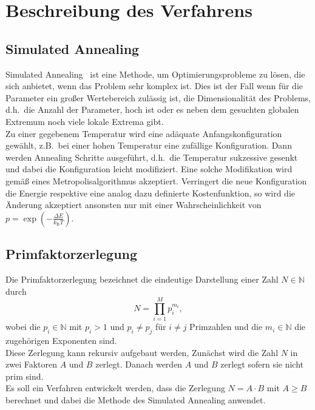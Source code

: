 \chapter{Beschreibung des Verfahrens}

\section{Simulated Annealing}
Simulated Annealing~\parencite{nr} ist eine Methode, um Optimierungsprobleme zu lösen, die sich anbietet, wenn das Problem sehr komplex ist. Dies ist der Fall wenn für die Parameter ein großer Wertebereich zulässig ist, die Dimensionalität des Problems, d.h.\ die Anzahl der Parameter, hoch ist oder es neben dem gesuchten globalen Extremum noch viele lokale Extrema gibt. \\
Zu einer gegebenem Temperatur wird eine adäquate Anfangskonfiguration gewählt, z.B.\ bei einer hohen Temperatur eine zufällige Konfiguration. Dann werden Annealing Schritte ausgeführt, d.h.\ die Temperatur sukzessive gesenkt und dabei die Konfiguration leicht modifiziert. Eine solche Modifikation wird gemäß eines Metropolisalgorithmus akzeptiert. Verringert die neue Konfiguration die Energie respektive eine analog dazu definierte Kostenfunktion, so wird die Änderung akzeptiert ansonsten nur mit einer Wahrscheinlichkeit von $p=\exp\left(-\frac{\Delta E}{k_\mathrm{B}T}\right)$.

\section{Primfaktorzerlegung}
Die Primfaktorzerlegung bezeichnet die eindeutige Darstellung einer Zahl $N\in\mathbb{N}$ durch
\begin{equation*}
  N=\prod\limits_{i=1}^M p_i^{m_i},
\end{equation*}
wobei die $p_i\in\mathbb{N}$ mit $p_i>1$ und $p_i\neq p_j$ für $i\neq j$ Primzahlen und die $m_i\in\mathbb{N}$ die zugehörigen Exponenten sind.\\
Diese Zerlegung kann rekursiv aufgebaut werden, Zunächst wird die Zahl $N$ in zwei Faktoren $A$ und $B$ zerlegt. Danach werden $A$ und $B$ zerlegt sofern sie nicht prim sind.\\
Es soll ein Verfahren entwickelt werden, dass die Zerlegung $N=A\cdot B$ mit $A\geq B$ berechnet und dabei die Methode des Simulated Annealing anwendet.\\

